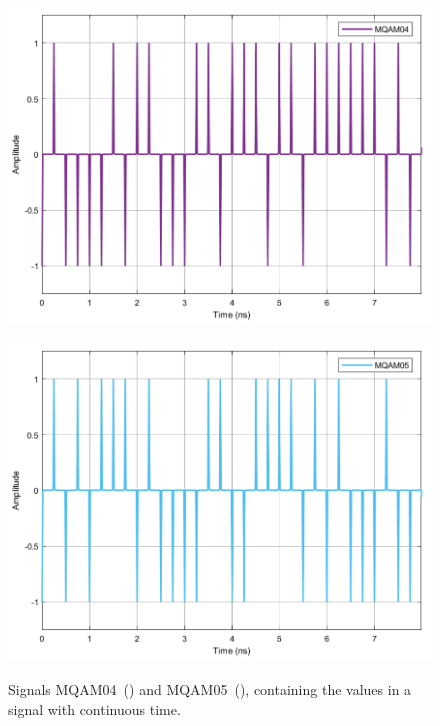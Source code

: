 	\begin{figure}[H]
	\centering
	\begin{minipage}{0.45\textwidth}
		\centering
		\includegraphics[width=1\textwidth]		
		{./sdf/m_qam_system/figures/simulations/01_noISI/MQAM04.pdf}
		\subcaption{}\label{fig:ISImqam4}
	\end{minipage}
	\begin{minipage}{0.45\textwidth}
		\centering
		\includegraphics[width=1\textwidth]
		{sdf/m_qam_system/figures/simulations/01_noISI/MQAM05.pdf}
		\subcaption{}\label{fig:ISImqam5}
	\end{minipage}
	\caption{Signals MQAM04~() and 
	MQAM05~(), 
		containing the values in a signal with continuous time.}
\end{figure}

